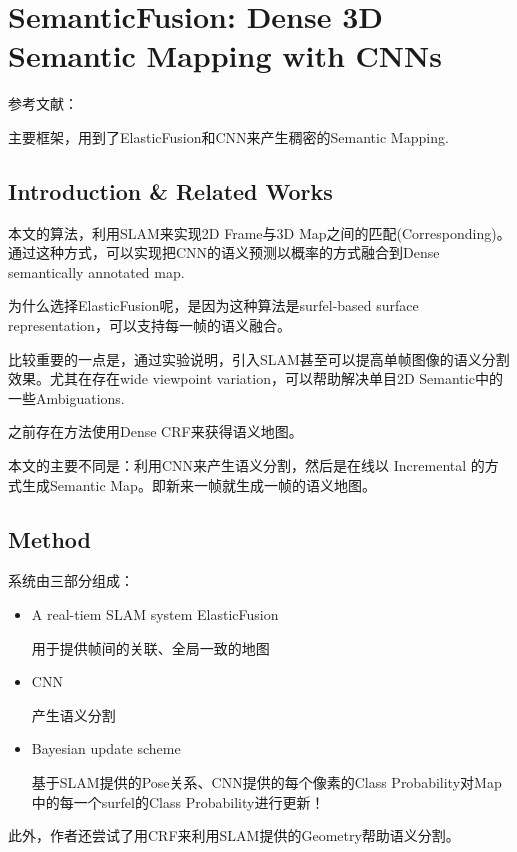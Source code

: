 \section{SemanticFusion: Dense 3D Semantic Mapping with CNNs}
参考文献：\cite{SemanticFusion2016}

主要框架，用到了ElasticFusion和CNN来产生稠密的Semantic Mapping.

\subsection{Introduction \& Related Works}

本文的算法，利用SLAM来实现2D Frame与3D Map之间的匹配(Corresponding)。通过这种方式，可以实现把CNN的语义预测以概率的方式融合到Dense semantically annotated map.

为什么选择ElasticFusion呢，是因为这种算法是surfel-based surface representation，可以支持每一帧的语义融合。

比较重要的一点是，通过实验说明，引入SLAM甚至可以提高单帧图像的语义分割效果。尤其在存在wide viewpoint variation，可以帮助解决单目2D Semantic中的一些Ambiguations.

之前存在方法使用Dense CRF来获得语义地图。

本文的主要不同是：利用CNN来产生语义分割，然后是在线以 Incremental 的方式生成Semantic Map。即新来一帧就生成一帧的语义地图。

\subsection{Method}

系统由三部分组成：
\begin{itemize}
\item A real-tiem SLAM system ElasticFusion

用于提供帧间的关联、全局一致的地图

\item CNN

产生语义分割

\item Bayesian update scheme

基于SLAM提供的Pose关系、CNN提供的每个像素的Class Probability对Map中的每一个surfel的Class Probability进行更新！

\end{itemize}

此外，作者还尝试了用CRF来利用SLAM提供的Geometry帮助语义分割。


